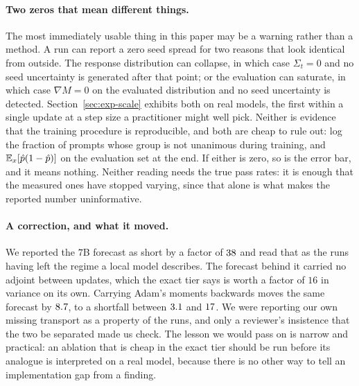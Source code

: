 \paragraph{Two zeros that mean different things.} The most immediately usable thing in this paper
may be a warning rather than a method. A run can report a zero seed spread for two reasons that
look identical from outside. The response distribution can collapse, in which case
$\Sigma_t = 0$ and no seed uncertainty is generated after that point; or the evaluation can
saturate, in which case $\nabla M = 0$ on the evaluated distribution and no seed uncertainty is
detected. Section~\ref{sec:exp-scale} exhibits both on real models, the first within a single update
at a step size a practitioner might well pick. Neither is evidence that the training procedure is
reproducible, and both are cheap to rule out: log the fraction of prompts whose group is not
unanimous during training, and $\mathbb{E}_x[\hat{p}(1-\hat{p})]$ on the evaluation set at the end. If
either is zero, so is the error bar, and it means nothing. Neither reading needs the true pass
rates: it is enough that the measured ones have stopped varying, since that alone is what makes
the reported number uninformative.

\paragraph{A correction, and what it moved.} We reported the $7$B forecast as short by a factor of
$38$ and read that as the runs having left the regime a local model
describes. The forecast behind it carried no adjoint between updates, which the exact tier says is
worth a factor of $16$ in variance on its own. Carrying Adam's moments backwards moves the same
forecast by $8.7$, to a shortfall between $3.1$ and
$17$. We were reporting our own missing transport as a property of the
runs, and only a reviewer's insistence that the two be separated made us check. The lesson we would
pass on is narrow and practical: an ablation that is cheap in the exact tier should be run before
its analogue is interpreted on a real model, because there is no other way to tell an
implementation gap from a finding.

